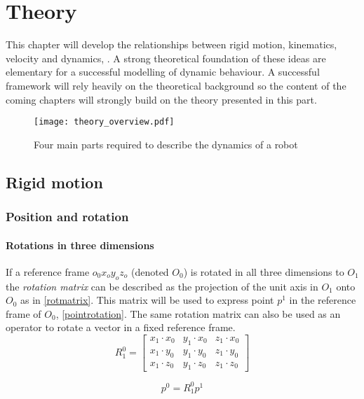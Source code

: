 \chapter{Theory}
This chapter will develop the relationships between rigid motion, kinematics, velocity and dynamics, . A strong theoretical foundation of these ideas are elementary for a successful modelling of dynamic behaviour. A successful framework will rely heavily on the theoretical background so the content of the coming chapters will strongly build on the theory presented in this part.

\begin{figure}
 \centering 
 \texttt{[image: theory\_overview.pdf]}
 \caption{Four main parts required to describe the dynamics of a robot}
 \label{theory_overview}
\end{figure}

\section{Rigid motion}
\subsection{Position and rotation}
\subsubsection{Rotations in three dimensions}

If a reference frame $o_0 x_o y_o z_o$ (denoted $O_0$) is rotated in all three dimensions to $O_1$ the \textit{rotation matrix} can be described as the projection of the unit axis in $O_1$ onto $O_0$ as in \eqref{rotmatrix}. This matrix will be used to express point $p^1$ in the reference frame of $O_0$, \eqref{pointrotation}. The same rotation matrix can also be used as an operator to rotate a vector in a fixed reference frame.
\begin{equation}\label{rotmatrix}
R^0_1=\begin{bmatrix}
x_1\cdot x_0 & y_1\cdot x_0 & z_1\cdot x_0\\ 
x_1\cdot y_0 & y_1\cdot y_0 & z_1\cdot y_0\\ 
x_1\cdot z_0 & y_1\cdot z_0 & z_1\cdot z_0
\end{bmatrix}
\end{equation}

\begin{equation}\label{pointrotation}
p^0 = R^0_1p^1
\end{equation}

